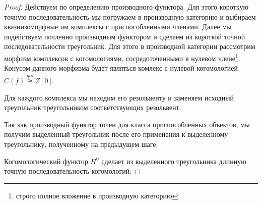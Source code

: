 \documentclass[../main.tex]{subfiles}
\begin{document}
\begin{proof}
Действуем по определению производного функтора. Для этого короткую точную последовательность мы погружаем в производную категорию и выбираем квазиизоморфные им комплексы с приспособленными членами. Далее мы подействуем почленно производным функтором и сделаем из короткой точной последовательности треугольник. Для этого в производной категории рассмотрим морфизм комплексов с когомологиями, сосредоточенными в нулевом члене\footnote{строго полное вложение в производную категорию}. Конусом данного морфизма будет являться комлекс с нулевой когомологией $C(f) \overset{qis}{\cong} Z[0]$. 
\bee
{}
\eee
Для каждого комплекса мы находим его резольвенту и заменяем исходный треугольник треугольником соответствующих резольвент.
\bee
{}
\eee
Так как производный функтор точен для класса приспособленных объектов, мы получим выделенный треугольник после его применения к выделенному треугольнику, полученному на предыдущем шаге.
\bee
{}
\eee
 Когомологический функтор $H^0$ сделает из выделенного треугольника длинную точную последовательность когомологий:
 \bee
{}
\eee
\end{proof}
\end{document}
